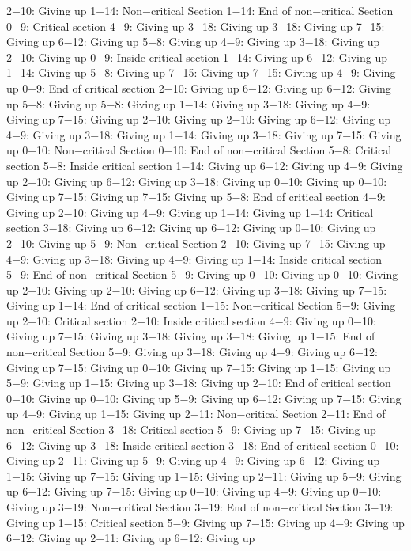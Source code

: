 2−10: Giving up
1−14: Non−critical Section
1−14: End of non−critical Section
0−9: Critical section
4−9: Giving up
3−18: Giving up
3−18: Giving up
7−15: Giving up
6−12: Giving up
5−8: Giving up
4−9: Giving up
3−18: Giving up
2−10: Giving up
0−9: Inside critical section
1−14: Giving up
6−12: Giving up
1−14: Giving up
5−8: Giving up
7−15: Giving up
7−15: Giving up
4−9: Giving up
0−9: End of critical section
2−10: Giving up
6−12: Giving up
6−12: Giving up
5−8: Giving up
5−8: Giving up
1−14: Giving up
3−18: Giving up
4−9: Giving up
7−15: Giving up
2−10: Giving up
2−10: Giving up
6−12: Giving up
4−9: Giving up
3−18: Giving up
1−14: Giving up
3−18: Giving up
7−15: Giving up
0−10: Non−critical Section
0−10: End of non−critical Section
5−8: Critical section
5−8: Inside critical section
1−14: Giving up
6−12: Giving up
4−9: Giving up
2−10: Giving up
6−12: Giving up
3−18: Giving up
0−10: Giving up
0−10: Giving up
7−15: Giving up
7−15: Giving up
5−8: End of critical section
4−9: Giving up
2−10: Giving up
4−9: Giving up
1−14: Giving up
1−14: Critical section
3−18: Giving up
6−12: Giving up
6−12: Giving up
0−10: Giving up
2−10: Giving up
5−9: Non−critical Section
2−10: Giving up
7−15: Giving up
4−9: Giving up
3−18: Giving up
4−9: Giving up
1−14: Inside critical section
5−9: End of non−critical Section
5−9: Giving up
0−10: Giving up
0−10: Giving up
2−10: Giving up
2−10: Giving up
6−12: Giving up
3−18: Giving up
7−15: Giving up
1−14: End of critical section
1−15: Non−critical Section
5−9: Giving up
2−10: Critical section
2−10: Inside critical section
4−9: Giving up
0−10: Giving up
7−15: Giving up
3−18: Giving up
3−18: Giving up
1−15: End of non−critical Section
5−9: Giving up
3−18: Giving up
4−9: Giving up
6−12: Giving up
7−15: Giving up
0−10: Giving up
7−15: Giving up
1−15: Giving up
5−9: Giving up
1−15: Giving up
3−18: Giving up
2−10: End of critical section
0−10: Giving up
0−10: Giving up
5−9: Giving up
6−12: Giving up
7−15: Giving up
4−9: Giving up
1−15: Giving up
2−11: Non−critical Section
2−11: End of non−critical Section
3−18: Critical section
5−9: Giving up
7−15: Giving up
6−12: Giving up
3−18: Inside critical section
3−18: End of critical section
0−10: Giving up
2−11: Giving up
5−9: Giving up
4−9: Giving up
6−12: Giving up
1−15: Giving up
7−15: Giving up
1−15: Giving up
2−11: Giving up
5−9: Giving up
6−12: Giving up
7−15: Giving up
0−10: Giving up
4−9: Giving up
0−10: Giving up
3−19: Non−critical Section
3−19: End of non−critical Section
3−19: Giving up
1−15: Critical section
5−9: Giving up
7−15: Giving up
4−9: Giving up
6−12: Giving up
2−11: Giving up
6−12: Giving up
